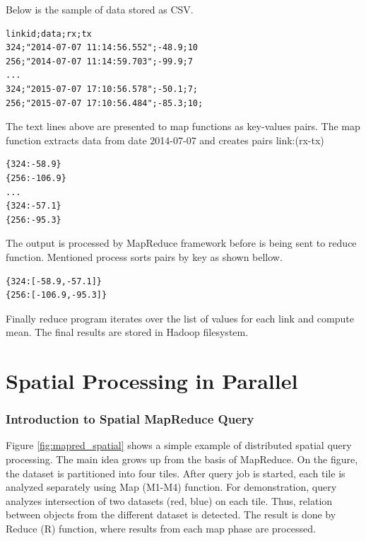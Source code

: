 \documentclass[a4paper,12pt,oneside]{report}
\begin{document}
	Below is the sample of data stored as CSV.
	\begin{footnotesize}
		\begin{lstlisting}[style=mybash]
linkid;data;rx;tx
324;"2014-07-07 11:14:56.552";-48.9;10
256;"2014-07-07 11:14:59.703";-99.9;7
...
324;"2015-07-07 17:10:56.578";-50.1;7;
256;"2015-07-07 17:10:56.484";-85.3;10;
		\end{lstlisting}
	\end{footnotesize}
	The text lines above are presented to map functions as key-values pairs.
	The map function extracts data from date 2014-07-07 and creates pairs
	{link:(rx-tx)}
	\begin{footnotesize}
		\begin{lstlisting}[style=mybash]
{324:-58.9}
{256:-106.9}
...
{324:-57.1}
{256:-95.3}
		\end{lstlisting}
	\end{footnotesize}
	The output is processed by MapReduce framework before is being sent to reduce
	function.
	Mentioned process sorts pairs by key as shown bellow.
	\begin{footnotesize}
		\begin{lstlisting}[style=mybash]
{324:[-58.9,-57.1]}
{256:[-106.9,-95.3]}
		\end{lstlisting}\end{footnotesize}
	Finally reduce program iterates over the list of values for each link and
	compute mean.
	The final results are stored in Hadoop filesystem.
	
	
	
	\section{Spatial Processing in Parallel}
	\subsubsection{Introduction to Spatial MapReduce Query}
	Figure \ref{fig:mapred_spatial} shows a simple example of distributed spatial
	query processing. The main idea 
	grows up from the basis of MapReduce. On the figure, the dataset is partitioned
	into four tiles. After 
	query job is started, each tile is analyzed separately using Map (M1-M4)
	function. For demonstration, 
	query analyzes intersection of two datasets (red, blue) on each tile. Thus,
	relation between 
	objects from the different dataset is detected. The result is done by Reduce (R)
	function, where results from each
	map phase are processed.
	
\end{document}
